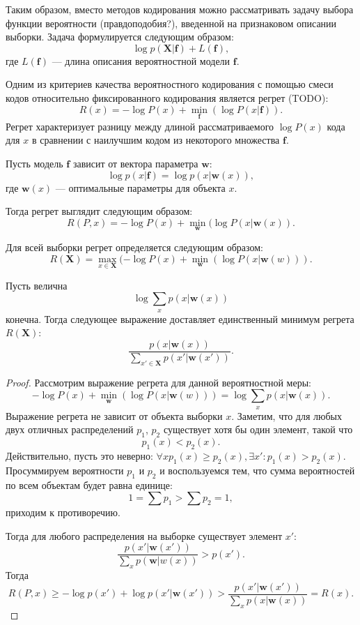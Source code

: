 \documentclass[../main.tex]{subfiles}
\begin{document}
Таким образом, вместо методов кодирования можно рассматривать задачу выбора функции вероятности (правдоподобия?), введенной на признаковом описании выборки. Задача формулируется следующим образом:
\[
    \log p(\mathbf{X}|\mathbf{f}) + L(\mathbf{f}), 
\]
где $L(\mathbf{f})$ --- длина описания вероятностной модели $\mathbf{f}$. 


Одним из критериев качества вероятностного кодирования с помощью смеси кодов относительно фиксированного кодирования является регрет (TODO):
\[
R(x) =  - \log P(x) + \min_{\mathbf{f}} (\log P(x|\mathbf{f})).
\]
Регрет характеризует разницу между длиной рассматриваемого $\log P(x)$ кода для $x$ в сравнении с наилучшим кодом из некоторого множества $\mathbf{f}$.

Пусть модель $\mathbf{f}$ зависит от вектора параметра $\mathbf{w}$:
\[
    \log p(x|\mathbf{f}) = \log p(x|\mathbf{w}(x)),
\]
где $\mathbf{w}(x)$ --- оптимальные параметры для объекта $x$.

Тогда регрет выглядит следующим образом:
\[
R(P, x) =  - \log P(x) + \min_{\mathbf{w}} (\log P(x|\mathbf{w}(x)).
\]

Для всей выборки регрет определяется следующим образом:
\[
R(\mathbf{X}) =  \max_{x \in \mathbf{X}} (- \log P(x) + \min_{\mathbf{w}} (\log P(x|\mathbf{w}(w))).
\]


\begin{theorem}
Пусть велична
\[
    \log \sum_{x} p(x|\mathbf{w}(x))
\]
конечна.  Тогда следующее выражение доставляет единственный минимум регрета $R(\mathbf{X})$:
\[
    \frac{p(x|\mathbf{w}(x))}{\sum_{x' \in \mathbf{X}}p(x'|\mathbf{w}(x')) }.
\]
\end{theorem}
\begin{proof}
Рассмотрим выражение регрета для данной вероятностной меры:
\[
    - \log P(x) + \min_{\mathbf{w}} (\log P(x|\mathbf{w}(w)))  = \log \sum_{x} p(x|\mathbf{w}(x)).
\]
Выражение регрета не зависит от объекта выборки $x$. 
Заметим, что для любых двух отличных распределений  $p_1$, $p_2$ существует хотя бы один элемент, такой что 
\[
    p_1(x) < p_2(x).
\]
Действительно, пусть это неверно: $\forall x p_1(x) \geq p_2(x), \exists x': p_1(x) > p_2(x)$. Просуммируем вероятности $p_1$ и $p_2$ и воспользуемся тем, что сумма вероятностей по всем объектам будет равна единице:
\[
   1 =  \sum p_1  > \sum p_2 = 1,
\]
приходим к противоречию.

Тогда для любого распределения на выборке существует элемент $x'$:
\[
    \frac{p(x'|\mathbf{w}(x'))}{\sum_{x}p(\mathbf{w}|w(x)) } > p(x').
\]
Тогда 
\[
R(P, x)  \geq -\log p(x') + \log p(x'|\mathbf{w}(x')) > \frac{p(x'|\mathbf{w}(x'))}{\sum_{x}p(x|\mathbf{w}(x)) } = R(x).
\]

\end{proof}
\end{document}
